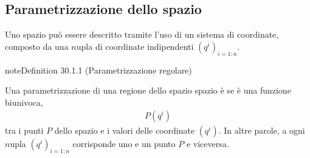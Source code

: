 \documentclass[letterpaper,10pt,italian]{jupyterBook}
\begin{document}
\subsection{Parametrizzazione dello spazio}
\label{\detokenize{ch/vector-calculus/geometry:parametrizzazione-dello-spazio}}\label{\detokenize{ch/vector-calculus/geometry:vector-calculus-geometry-coordinates}}
\sphinxAtStartPar
Uno spazio può essere descritto tramite l’uso di un sistema di coordinate, composto da una \(n\)\sphinxhyphen{}upla di coordinate indipendenti \(\left( q^i \right)_{i = 1:n}\).
\label{ch/vector-calculus/geometry:def-parametrization-regular}
\begin{sphinxadmonition}{note}{Definition 30.1.1 (Parametrizzazione regolare)}



\sphinxAtStartPar
Una parametrizzazione di una regione dello spazio spazio è  se è una funzione biunivoca,
\begin{equation*}
\begin{split}P\left(q^i \right)\end{split}
\end{equation*}
\sphinxAtStartPar
tra i punti \(P\) dello spazio e i valori delle coordinate \(\left( q^i \right)\). In altre parole, a ogni \(n\)\sphinxhyphen{}upla \(\left( q^i \right)_{i=1:n}\) corrisponde uno e un punto \(P\) e viceversa.
\end{sphinxadmonition}
\end{document}

